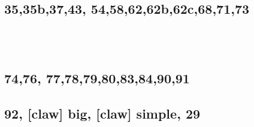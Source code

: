 \documentclass[11pt]{article}
\begin{document}
\subsection*{35,35b,37,43, 54,58,62,62b,62c,68,71,73}
 \\
\\



\subsection*{74,76, 77,78,79,80,83,84,90,91}


\subsection*{92, [claw] big, [claw] simple, 29}
\end{document}
